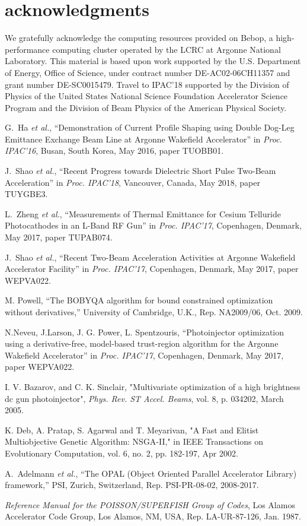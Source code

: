 \documentclass[letterpaper,  %
              ]{jacow-2_3}   %
\begin{document}
\section{acknowledgments}
We gratefully acknowledge the computing resources
provided on Bebop, a high-performance computing cluster
operated by the LCRC at Argonne National Laboratory.
This material is based upon work supported by the 
U.S. Department of Energy, Office of Science, under 
contract number DE-AC02-06CH11357 and grant number DE-SC0015479. 
Travel to IPAC'18 supported by the Division of Physics 
of the United States National Science Foundation 
Accelerator Science Program and the Division of 
Beam Physics of the American Physical Society.




\begin{thebibliography}{9}
G.~Ha \emph{et al.}, “Demonstration of Current Profile 
Shaping using Double Dog-Leg Emittance Exchange Beam 
Line at Argonne Wakefield Accelerator”
in \textit{Proc. IPAC’16}, 
Busan, South Korea, May 2016, 
paper TUOBB01.

J.~Shao \emph{et al.}, “Recent Progress towards Dielectric Short Pulse Two-Beam Acceleration”
in \textit{Proc. IPAC’18}, 
Vancouver, Canada, May 2018, 
paper TUYGBE3.

L.~Zheng \emph{et al.}, “Measurements of Thermal Emittance 
for Cesium Telluride Photocathodes in an L-Band RF Gun”
in \textit{Proc. IPAC’17}, 
Copenhagen, Denmark, May 2017, 
paper TUPAB074.

J.~Shao \emph{et al.}, “Recent Two-Beam 
Acceleration Activities at Argonne Wakefield Accelerator Facility”
in \textit{Proc. IPAC’17}, 
Copenhagen, Denmark, May 2017, 
paper WEPVA022.

M. Powell, “The BOBYQA algorithm for bound constrained
optimization without derivatives,” University of Cambridge,
U.K., Rep. NA2009/06, Oct. 2009.

N.Neveu, J.Larson, J. G. Power, L. Spentzouris, 
“Photoinjector optimization using a derivative-free, model-based trust-region algorithm for the Argonne Wakefield Accelerator”
in \textit{Proc. IPAC’17}, 
Copenhagen, Denmark, May 2017, 
paper WEPVA022.

I. V. Bazarov, and C. K. Sinclair,
"Multivariate optimization of a high brightness dc gun photoinjector",
\emph{Phys. Rev. ST Accel. Beams}, vol. 8, p. 034202, March 2005. 



K. Deb, A. Pratap, S. Agarwal and T. Meyarivan, 
"A Fast and Elitist Multiobjective Genetic Algorithm: NSGA-II," 
in IEEE Transactions on Evolutionary Computation, 
vol. 6, no. 2, pp. 182-197, Apr 2002.

A.~Adelmann \emph{et al.},
“The OPAL (Object Oriented Parallel Accelerator Library) framework,”
PSI, Zurich, Switzerland,
Rep. PSI-PR-08-02, 2008-2017.

\emph{Reference Manual for the POISSON/SUPERFISH Group of 
	Codes},  Los Alamos Accelerator Code Group,  
 Los Alamos, NM, USA, 
 Rep. LA-UR-87-126, Jan. 1987.
\end{thebibliography}
\end{document}
